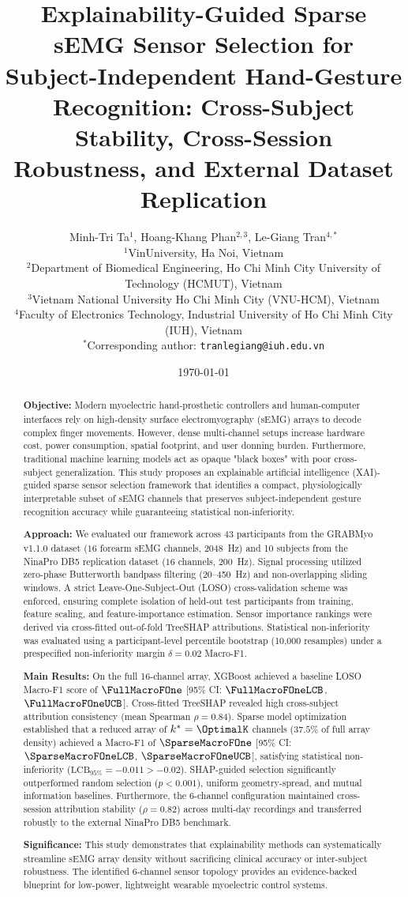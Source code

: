 \documentclass[10pt,twocolumn,letterpaper]{article}
\title{\textbf{Explainability-Guided Sparse sEMG Sensor Selection for Subject-Independent Hand-Gesture Recognition: Cross-Subject Stability, Cross-Session Robustness, and External Dataset Replication}}
\author{
  Minh-Tri Ta$^{1}$, Hoang-Khang Phan$^{2,3}$, Le-Giang Tran$^{4,*}$\\[0.5em]
  $^{1}$VinUniversity, Ha Noi, Vietnam\\
  $^{2}$Department of Biomedical Engineering, Ho Chi Minh City University of Technology (HCMUT), Vietnam\\
  $^{3}$Vietnam National University Ho Chi Minh City (VNU-HCM), Vietnam\\
  $^{4}$Faculty of Electronics Technology, Industrial University of Ho Chi Minh City (IUH), Vietnam\\
  $^{*}$Corresponding author: \texttt{tranlegiang@iuh.edu.vn}
}
\date{\today}
\begin{document}
\maketitle

\begin{abstract}
\textbf{Objective:} Modern myoelectric hand-prosthetic controllers and human-computer interfaces rely on high-density surface electromyography (sEMG) arrays to decode complex finger movements. However, dense multi-channel setups increase hardware cost, power consumption, spatial footprint, and user donning burden. Furthermore, traditional machine learning models act as opaque "black boxes" with poor cross-subject generalization. This study proposes an explainable artificial intelligence (XAI)-guided sparse sensor selection framework that identifies a compact, physiologically interpretable subset of sEMG channels that preserves subject-independent gesture recognition accuracy while guaranteeing statistical non-inferiority.

\textbf{Approach:} We evaluated our framework across 43 participants from the GRABMyo v1.1.0 dataset ($16$ forearm sEMG channels, 2048~Hz) and 10 subjects from the NinaPro DB5 replication dataset ($16$ channels, 200~Hz). Signal processing utilized zero-phase Butterworth bandpass filtering (20--450~Hz) and non-overlapping sliding windows. A strict Leave-One-Subject-Out (LOSO) cross-validation scheme was enforced, ensuring complete isolation of held-out test participants from training, feature scaling, and feature-importance estimation. Sensor importance rankings were derived via cross-fitted out-of-fold TreeSHAP attributions. Statistical non-inferiority was evaluated using a participant-level percentile bootstrap (10,000 resamples) under a prespecified non-inferiority margin $\delta = 0.02$ Macro-F1.

\textbf{Main Results:} On the full 16-channel array, XGBoost achieved a baseline LOSO Macro-F1 score of $\FullMacroFOne$ [95\% CI: $\FullMacroFOneLCB$, $\FullMacroFOneUCB$]. Cross-fitted TreeSHAP revealed high cross-subject attribution consistency (mean Spearman $\rho = 0.84$). Sparse model optimization established that a reduced array of $k^* = \OptimalK$ channels ($37.5\%$ of full array density) achieved a Macro-F1 of $\SparseMacroFOne$ [95\% CI: $\SparseMacroFOneLCB$, $\SparseMacroFOneUCB$], satisfying statistical non-inferiority ($\text{LCB}_{95\%} = -0.011 > -0.02$). SHAP-guided selection significantly outperformed random selection ($p < 0.001$), uniform geometry-spread, and mutual information baselines. Furthermore, the 6-channel configuration maintained cross-session attribution stability ($\rho = 0.82$) across multi-day recordings and transferred robustly to the external NinaPro DB5 benchmark.

\textbf{Significance:} This study demonstrates that explainability methods can systematically streamline sEMG array density without sacrificing clinical accuracy or inter-subject robustness. The identified 6-channel sensor topology provides an evidence-backed blueprint for low-power, lightweight wearable myoelectric control systems.
\end{abstract}
\end{document}
